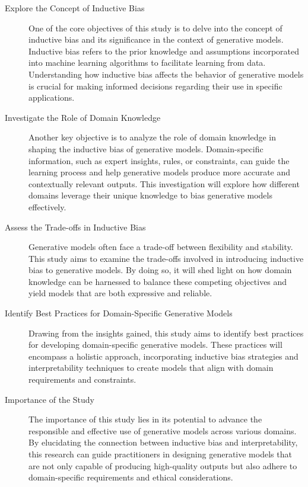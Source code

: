 \begin{description}
    \item [Explore the Concept of Inductive Bias] One of the core objectives of this study is to delve into the concept of inductive bias and its significance in the context of generative models. Inductive bias refers to the prior knowledge and assumptions incorporated into machine learning algorithms to facilitate learning from data. Understanding how inductive bias affects the behavior of generative models is crucial for making informed decisions regarding their use in specific applications.
    \item [Investigate the Role of Domain Knowledge] Another key objective is to analyze the role of domain knowledge in shaping the inductive bias of generative models. Domain-specific information, such as expert insights, rules, or constraints, can guide the learning process and help generative models produce more accurate and contextually relevant outputs. This investigation will explore how different domains leverage their unique knowledge to bias generative models effectively.
    \item [Assess the Trade-offs in Inductive Bias] Generative models often face a trade-off between flexibility and stability. This study aims to examine the trade-offs involved in introducing inductive bias to generative models. By doing so, it will shed light on how domain knowledge can be harnessed to balance these competing objectives and yield models that are both expressive and reliable.
    \item [Identify Best Practices for Domain-Specific Generative Models] Drawing from the insights gained, this study aims to identify best practices for developing domain-specific generative models. These practices will encompass a holistic approach, incorporating inductive bias strategies and interpretability techniques to create models that align with domain requirements and constraints.
    \item [Importance of the Study] The importance of this study lies in its potential to advance the responsible and effective use of generative models across various domains. By elucidating the connection between inductive bias and interpretability, this research can guide practitioners in designing generative models that are not only capable of producing high-quality outputs but also adhere to domain-specific requirements and ethical considerations.
\end{description}



